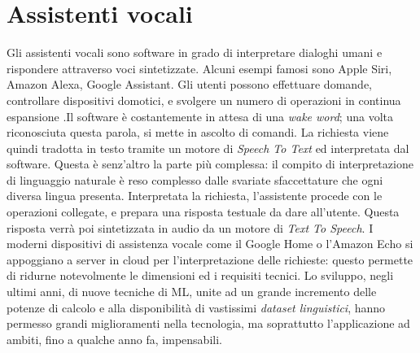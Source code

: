 \section{Assistenti vocali}
Gli assistenti vocali sono software in grado di interpretare dialoghi umani e rispondere attraverso voci sintetizzate. Alcuni esempi famosi sono Apple Siri, Amazon Alexa, Google Assistant. Gli utenti possono effettuare domande, controllare dispositivi domotici, e svolgere un numero di operazioni in continua espansione \cite{article:introduction_to_va}.Il software è costantemente in attesa di una \textit{wake word}; una volta riconosciuta questa parola, si mette in ascolto di comandi. La richiesta viene quindi tradotta in testo tramite un motore di \textit{Speech To Text} ed interpretata dal software. Questa è senz'altro la parte più complessa: il compito di interpretazione di linguaggio naturale è reso complesso dalle svariate sfaccettature che ogni diversa lingua presenta. Interpretata la richiesta, l'assistente procede con le operazioni collegate, e prepara una risposta testuale da dare all'utente. Questa risposta verrà poi sintetizzata in audio da un motore di \textit{Text To Speech}. I moderni dispositivi di assistenza vocale come il Google Home o l'Amazon Echo si appoggiano a server in cloud per l'interpretazione delle richieste: questo permette di ridurne notevolmente le dimensioni ed i requisiti tecnici.
Lo sviluppo, negli ultimi anni, di nuove tecniche di ML, unite ad un grande incremento delle potenze di calcolo e alla disponibilità di vastissimi \textit{dataset linguistici}, hanno permesso grandi miglioramenti nella tecnologia, ma soprattutto l'applicazione ad ambiti, fino a qualche anno fa, impensabili.
